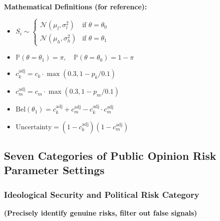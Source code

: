 \documentclass[11pt,a4paper]{report}
\newcommand{\Prob}{\mathbb{P}}
\begin{document}
\vspace{1em}
\noindent\textbf{Mathematical Definitions (for reference):}
\begin{itemize}[leftmargin=*, noitemsep, topsep=0.5em]
    \item $S_i \sim \begin{cases} \mathcal{N}(\mu_l, \sigma_l^2) & \text{if } \theta = \theta_0 \\ \mathcal{N}(\mu_h, \sigma_h^2) & \text{if } \theta = \theta_1 \end{cases}$
    \item $\Prob(\theta = \theta_1) = \pi,\quad \Prob(\theta = \theta_0) = 1 - \pi$
    \item $c_k^{\text{adj}} = c_k \cdot \max(0.3, 1 - p_k/0.1)$
    \item $c_m^{\text{adj}} = c_m \cdot \max(0.3, 1 - p_m/0.1)$
    \item $\text{Bel}(\theta_1) = c_k^{\text{adj}} + c_m^{\text{adj}} - c_k^{\text{adj}} \cdot c_m^{\text{adj}}$
    \item $\text{Uncertainty} = (1 - c_k^{\text{adj}})(1 - c_m^{\text{adj}})$
\end{itemize}

\clearpage

\subsection{Seven Categories of Public Opinion Risk Parameter Settings}

\subsubsection{Ideological Security and Political Risk Category}
\textbf{(Precisely identify genuine risks, filter out false signals)}
\end{document}
